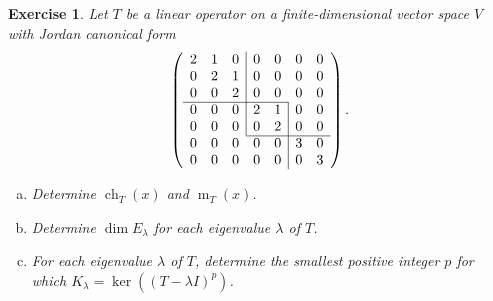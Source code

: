 \documentclass[a4paper]{article}
\theoremstyle{mystyle}
\newtheorem{exercise}[theorem]{Exercise}
\newcommand{\6}{\partial}
\DeclareMathOperator{\ch}{ch}
\DeclareMathOperator{\m}{m}
\begin{document}
 \begin{exercise}
    Let $T$ be a linear operator on a finite-dimensional vector space $V$ with Jordan canonical form
    \[
    \left(
    \begin{array}{cccccccc}
        2 & 1 & \multicolumn{1}{l|}{0} & 0 & 0 & 0 & 0 \\
        0 & 2 & \multicolumn{1}{l|}{1} & 0 & 0 & 0 & 0 \\
        0 & 0 & \multicolumn{1}{l|}{2} & 0 & 0 & 0 & 0 \\ \cline{1-5}
        0 & 0 & \multicolumn{1}{l|}{0} & 2 & \multicolumn{1}{l|}{1} & 0 & 0 \\
        0 & 0 & \multicolumn{1}{l|}{0} & 0 & \multicolumn{1}{l|}{2} & 0 & 0 \\ \cline{4-7}
        0 & 0 & 0 & 0 & \multicolumn{1}{l|}{0} & 3 & 0 \\
        0 & 0 & 0 & 0 & \multicolumn{1}{l|}{0} & 0 & 3
    \end{array}
    \right).
    \]
    \begin{enumerate}[(a)]
        \item Determine $\ch_T(x)$ and $\m_T(x)$.
        \item Determine $\dim E_\lambda$ for each eigenvalue $\lambda$ of $T$.
        \item For each eigenvalue $\lambda$ of $T$, determine the smallest positive integer $p$ for which $K_\lambda=\ker((T-\lambda I)^p)$.
    \end{enumerate}
\end{exercise}
\end{document}
